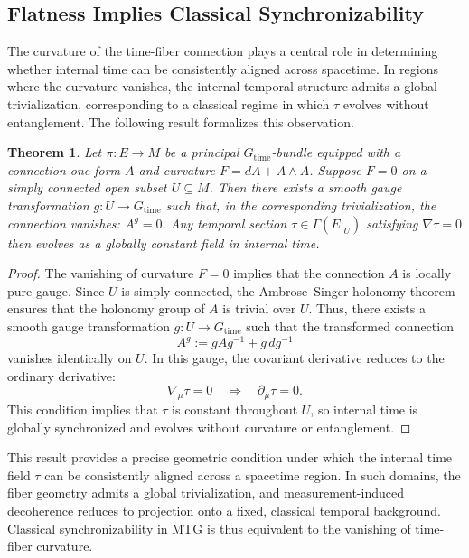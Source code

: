 \documentclass[11pt]{article}
\newtheorem{theorem}{Theorem}
\begin{document}
\subsection{Flatness Implies Classical Synchronizability}

The curvature of the time-fiber connection plays a central role in determining whether internal time can be consistently aligned across spacetime. In regions where the curvature vanishes, the internal temporal structure admits a global trivialization, corresponding to a classical regime in which \( \tau \) evolves without entanglement. The following result formalizes this observation.

\begin{theorem}\label{thm:flatness_synchronization}
Let \( \pi : E \to M \) be a principal \( G_{\text{time}} \)-bundle equipped with a connection one-form \( A \) and curvature \( F = dA + A \wedge A \). Suppose \( F = 0 \) on a simply connected open subset \( U \subseteq M \). Then there exists a smooth gauge transformation \( g : U \to G_{\text{time}} \) such that, in the corresponding trivialization, the connection vanishes: \( A^g = 0 \). Any temporal section \( \tau \in \Gamma(E|_U) \) satisfying \( \nabla \tau = 0 \) then evolves as a globally constant field in internal time.
\end{theorem}

\begin{proof}
The vanishing of curvature \( F = 0 \) implies that the connection \( A \) is locally pure gauge. Since \( U \) is simply connected, the Ambrose--Singer holonomy theorem ensures that the holonomy group of \( A \) is trivial over \( U \). Thus, there exists a smooth gauge transformation \( g : U \to G_{\text{time}} \) such that the transformed connection
\begin{equation}
A^g := g A g^{-1} + g \, d g^{-1}
\end{equation}
vanishes identically on \( U \). In this gauge, the covariant derivative reduces to the ordinary derivative:
\begin{equation}
\nabla_\mu \tau = 0 \quad \Rightarrow \quad \partial_\mu \tau = 0.
\end{equation}
This condition implies that \( \tau \) is constant throughout \( U \), so internal time is globally synchronized and evolves without curvature or entanglement.
\end{proof}

This result provides a precise geometric condition under which the internal time field \( \tau \) can be consistently aligned across a spacetime region. In such domains, the fiber geometry admits a global trivialization, and measurement-induced decoherence reduces to projection onto a fixed, classical temporal background. Classical synchronizability in MTG is thus equivalent to the vanishing of time-fiber curvature.
\end{document}
